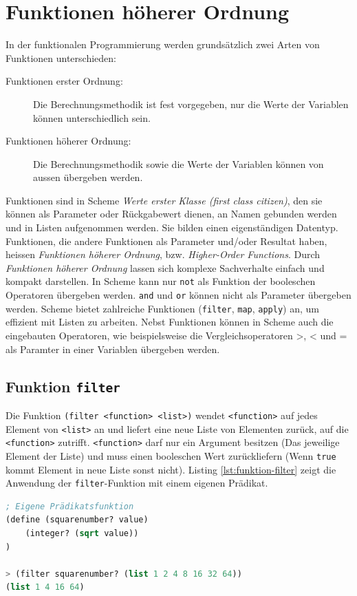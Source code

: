 \section{Funktionen höherer Ordnung}

In der funktionalen Programmierung werden grundsätzlich zwei Arten von Funktionen unterschieden:
\begin{description}
	\item[Funktionen erster Ordnung:] Die Berechnungsmethodik ist fest vorgegeben, nur die Werte der Variablen können unterschiedlich sein.
	\item[Funktionen höherer Ordnung:] Die Berechnungsmethodik sowie die Werte der Variablen können von aussen übergeben werden.
\end{description}
Funktionen sind in Scheme \textit{Werte erster Klasse (first class citizen)}, den sie können als Parameter oder Rückgabewert dienen, an Namen gebunden werden und in Listen aufgenommen werden. Sie bilden einen eigenständigen Datentyp. Funktionen, die andere Funktionen als Parameter und/oder Resultat haben, heissen \textit{Funktionen höherer Ordnung}, bzw. \textit{Higher-Order Functions}. Durch \textit{Funktionen höherer Ordnung} lassen sich komplexe Sachverhalte einfach und kompakt darstellen. In Scheme kann nur \verb|not| als Funktion der booleschen Operatoren übergeben werden. \verb|and| und \verb|or| können nicht als Parameter übergeben werden. Scheme bietet zahlreiche Funktionen (\verb|filter|, \verb|map|, \verb|apply|) an, um effizient mit Listen zu arbeiten. Nebst Funktionen können in Scheme auch die eingebauten Operatoren, wie beispielsweise die Vergleichsoperatoren >, < und = als Paramter in einer Variablen übergeben werden.

\subsection{Funktion \texttt{filter}}

Die Funktion \verb|(filter <function> <list>)| wendet \verb|<function>| auf jedes Element von  \verb|<list>| an und liefert eine neue Liste von Elementen zurück, auf die \verb|<function>| zutrifft. \verb|<function>| darf nur ein Argument besitzen (Das jeweilige Element der Liste) und muss einen booleschen Wert zurückliefern (Wenn \verb|true| kommt Element in neue Liste sonst nicht). Listing \ref{lst:funktion-filter} zeigt die Anwendung der \verb|filter|-Funktion mit einem eigenen Prädikat.

\begin{lstlisting}[language=Lisp, caption=Funktion filter, label=lst:funktion-filter]
; Eigene Prädikatsfunktion
(define (squarenumber? value)
	(integer? (sqrt value))
)

> (filter squarenumber? (list 1 2 4 8 16 32 64))
(list 1 4 16 64)
\end{lstlisting}

